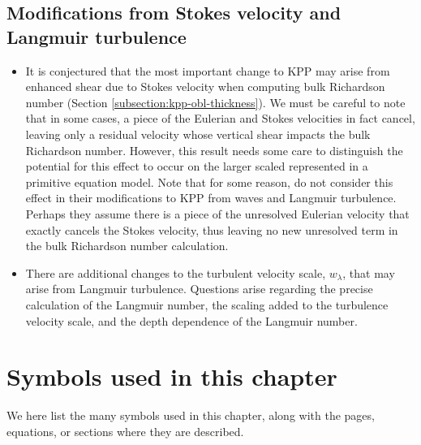 \subsection{Modifications from Stokes velocity and Langmuir
  turbulence}
\label{subsection:stokes-langmuir-kpp}

\begin{itemize}

\item It is conjectured that the most important change to KPP may
  arise from enhanced shear due to Stokes velocity when computing bulk
  Richardson number (Section \ref{subsection:kpp-obl-thickness}).  We
  must be careful to note that in some cases, a piece of the Eulerian
  and Stokes velocities in fact cancel, leaving only a residual
  velocity whose vertical shear impacts the bulk Richardson number.
  However, this result needs some care to distinguish the potential
  for this effect to occur on the larger scaled represented in a
  primitive equation model.  Note that for some reason,
  \cite{Smyth_etal2002} do not consider this effect in their
  modifications to KPP from waves and Langmuir turbulence.  Perhaps
  they assume there is a piece of the unresolved Eulerian velocity
  that exactly cancels the Stokes velocity, thus leaving no new
  unresolved term in the bulk Richardson number calculation.

\item There are additional changes to the turbulent velocity scale,
  $w_{\lambda}$, that may arise from Langmuir turbulence.  Questions
  arise regarding the precise calculation of the Langmuir number, the
  scaling added to the turbulence velocity scale, and the depth
  dependence of the Langmuir number.   

\end{itemize}



\section{Symbols used in this chapter}
\label{section:list-of-symbols}

We here list the many symbols used in this chapter, along with the
pages, equations, or sections where they are described.


\subsection*{}

